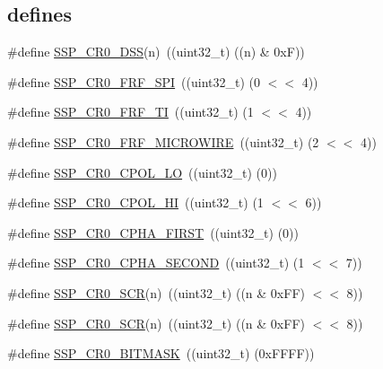 \subsection*{\textquotesingle{}defines\textquotesingle{}}
\begin{DoxyCompactItemize}
\item 
\#define \hyperlink{group___s_s_p__18_x_x__43_x_x_ga691ba9dbc6a0722a81ed4734c7f7ac8f}{S\+S\+P\+\_\+\+C\+R0\+\_\+\+D\+SS}(n)~((uint32\+\_\+t) ((n) \& 0x\+F))
\item 
\#define \hyperlink{group___s_s_p__18_x_x__43_x_x_ga4f0f58a8f4b87af0f18e84b981c31a74}{S\+S\+P\+\_\+\+C\+R0\+\_\+\+F\+R\+F\+\_\+\+S\+PI}~((uint32\+\_\+t) (0 $<$$<$ 4))
\item 
\#define \hyperlink{group___s_s_p__18_x_x__43_x_x_ga54c718a1a75a1e5e06417b9f8267ee27}{S\+S\+P\+\_\+\+C\+R0\+\_\+\+F\+R\+F\+\_\+\+TI}~((uint32\+\_\+t) (1 $<$$<$ 4))
\item 
\#define \hyperlink{group___s_s_p__18_x_x__43_x_x_ga7ca858fcf0f529a38e1e1bf0a69d4486}{S\+S\+P\+\_\+\+C\+R0\+\_\+\+F\+R\+F\+\_\+\+M\+I\+C\+R\+O\+W\+I\+RE}~((uint32\+\_\+t) (2 $<$$<$ 4))
\item 
\#define \hyperlink{group___s_s_p__18_x_x__43_x_x_gab4353fed07ef845a3796e154397f7e76}{S\+S\+P\+\_\+\+C\+R0\+\_\+\+C\+P\+O\+L\+\_\+\+LO}~((uint32\+\_\+t) (0))
\item 
\#define \hyperlink{group___s_s_p__18_x_x__43_x_x_ga36d7ad75edb14d318d710f964384f466}{S\+S\+P\+\_\+\+C\+R0\+\_\+\+C\+P\+O\+L\+\_\+\+HI}~((uint32\+\_\+t) (1 $<$$<$ 6))
\item 
\#define \hyperlink{group___s_s_p__18_x_x__43_x_x_gaee3465bdb33add1970f6ce7f7bc638c4}{S\+S\+P\+\_\+\+C\+R0\+\_\+\+C\+P\+H\+A\+\_\+\+F\+I\+R\+ST}~((uint32\+\_\+t) (0))
\item 
\#define \hyperlink{group___s_s_p__18_x_x__43_x_x_gae4150d0b2513ff70568be15c2170c9ea}{S\+S\+P\+\_\+\+C\+R0\+\_\+\+C\+P\+H\+A\+\_\+\+S\+E\+C\+O\+ND}~((uint32\+\_\+t) (1 $<$$<$ 7))
\item 
\#define \hyperlink{group___s_s_p__18_x_x__43_x_x_ga10f56047b6024ff848675f9463f1b989}{S\+S\+P\+\_\+\+C\+R0\+\_\+\+S\+CR}(n)~((uint32\+\_\+t) ((n \& 0x\+F\+F) $<$$<$ 8))
\item 
\#define \hyperlink{group___s_s_p__18_x_x__43_x_x_ga10f56047b6024ff848675f9463f1b989}{S\+S\+P\+\_\+\+C\+R0\+\_\+\+S\+CR}(n)~((uint32\+\_\+t) ((n \& 0x\+F\+F) $<$$<$ 8))
\item 
\#define \hyperlink{group___s_s_p__18_x_x__43_x_x_ga90be93bebdbdfee011d90ea6e054260a}{S\+S\+P\+\_\+\+C\+R0\+\_\+\+B\+I\+T\+M\+A\+SK}~((uint32\+\_\+t) (0x\+F\+F\+F\+F))
$$
\end{DoxyCompactItemize}
